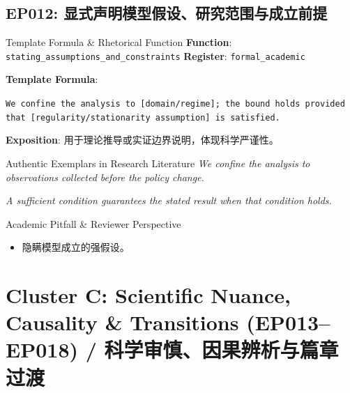 \subsection{EP012: 显式声明模型假设、研究范围与成立前提}\label{sec:ep:EP012}
\begin{ConceptBox}{Template Formula \& Rhetorical Function}
\textbf{Function}: \texttt{stating\_assumptions\_and\_constraints} \quad \textbf{Register}: \texttt{formal\_academic}\par\vspace{3pt}
\textbf{Template Formula}:\par\noindent\texttt{We confine the analysis to [domain/regime]; the bound holds provided that [regularity/stationarity assumption] is satisfied.}\par\vspace{4pt}
\textbf{Exposition}: 用于理论推导或实证边界说明，体现科学严谨性。
\end{ConceptBox}
\begin{ExampleBox}{Authentic Exemplars in Research Literature}
\textit{We confine the analysis to observations collected before the policy change.}\par\vspace{2pt}
\textit{A sufficient condition guarantees the stated result when that condition holds.}\par\vspace{2pt}
\end{ExampleBox}
\begin{TipBox}{Academic Pitfall \& Reviewer Perspective}
\begin{itemize}[leftmargin=1.5em, itemsep=1pt]
  \item 隐瞒模型成立的强假设。
\end{itemize}
\end{TipBox}
\vspace{6pt}
\section{Cluster C: Scientific Nuance, Causality \& Transitions (EP013--EP018) / 科学审慎、因果辨析与篇章过渡}
